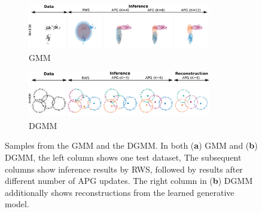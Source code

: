\documentclass{article}
\theoremstyle{definition}
\begin{document}
\begin{figure}[t!]
  \centering
  \begin{subfigure}[t]{0.5\textwidth}
  \includegraphics[width=80mm]{figures/gmm_samples_1datasets.pdf}
  \vspace*{-1mm}
  \caption{GMM}
  \label{samples-gmm}
  \vspace{-1ex}
  \end{subfigure}%
  \begin{subfigure}[t]{0.5\textwidth}
  \includegraphics[width=80mm]{figures/dgmm_samples_1datasets.pdf}
  \vspace*{-1mm}
  \caption{DGMM}
  \label{samples-dgmm}
  \vspace{-1ex}
  \end{subfigure}
  \caption{Samples from the GMM and the DGMM. In both (\textbf{a}) GMM and (\textbf{b}) DGMM, the left column shows one test dataset, The subsequent columns show inference results by RWS, followed by results after different number of APG updates. The right column in (\textbf{b}) DGMM additionally shows reconstructions from the learned generative model.}
  \label{samples-mixture}
\end{figure}
\end{document}
